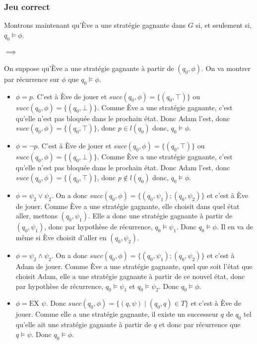 \documentclass[10pt,a4paper]{article}
\begin{document}
\subsubsection{Jeu correct}
Montrons maintenant qu'Ève a une stratégie gagnante dans $G$ si, et seulement si, $q_0 \vDash \phi$.

\paragraph{$\implies$}
On suppose qu'Ève a une stratégie gagnante à partir de $(q_0, \phi)$. On va montrer par récurrence sur $\phi$ que $q_0 \vDash \phi$.

\begin{itemize}
\item $\phi = p$. C'est à Ève de jouer et $succ(q_0,\phi) = \{(q_0, \top)\}$ ou $succ(q_0,\phi) = \{(q_0, \bot)\}$. Comme Ève a une stratégie gagnante, c'est qu'elle n'est pas bloquée dans le prochain état. Donc Adam l'est, donc $succ(q_0,\phi) = \{(q_0, \top)\}$, donc $p \in l(q_0)$ donc, $q_0 \vDash \phi$.

\item $\phi = \neg p$. C'est à Ève de jouer et $succ(q_0,\phi) = \{(q_0, \top)\}$ ou $succ(q_0,\phi) = \{(q_0, \bot)\}$. Comme Ève a une stratégie gagnante, c'est qu'elle n'est pas bloquée dans le prochain état. Donc Adam l'est, donc $succ(q_0,\phi) = \{(q_0, \top)\}$, donc $p \notin l(q_0)$ donc, $q_0 \vDash \phi$.

\item $\phi = \psi_2 \lor \psi_2$. On a donc $succ(q_0,\phi) = \{(q_0, \psi_1); (q_0, \psi_2) \}$ et c'est à Ève de jouer. Comme Ève a une stratégie gagnante, elle choisit dans quel état aller, mettons $(q_0, \psi_1)$. Elle a donc une stratégie gagnante à partir de $(q_0, \psi_1)$, donc par hypothèse de récurrence, $q_0 \vDash \psi_1$. Donc $q_0 \vDash \phi$. Il en va de même si Ève choisit d'aller en $(q_0, \psi_2)$.

\item $\phi = \psi_2 \land \psi_2$. On a donc $succ(q_0,\phi) = \{(q_0, \psi_1); (q_0, \psi_2) \}$ et c'est à Adam de jouer. Comme Ève a une stratégie gagnante, quel que soit l'état que choisit Adam, elle a une stratégie gagnante à partir de ce nouvel état, donc par hypothèse de récurrence, $q_0 \vDash \psi_1$ et $q_0 \vDash \psi_2$. Donc $q_0 \vDash \phi$.

\item $\phi = \mbox{EX } \psi$. Donc $succ(q_0, \phi) = \{ (q, \psi) \mid (q_0,q) \in T \} $ et c'est à Ève de jouer. Comme elle a une stratégie gagnante, il existe un successeur $q$ de $q_0$ tel qu'elle ait une stratégie gagnante à partir de $q$ et donc par récurrence que $q \vDash \psi$. Donc $q_0 \vDash \phi$.


\end{itemize}
\end{document}

